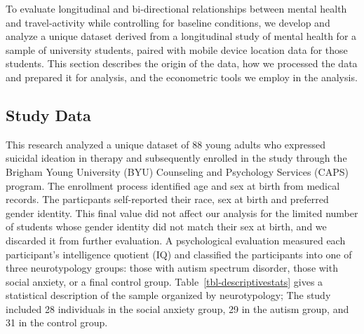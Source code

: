 \documentclass[
  letterpaper,
  number,
  review,
  3p]{elsarticle}
\begin{document}
To evaluate longitudinal and bi-directional relationships between mental
health and travel-activity while controlling for baseline conditions, we
develop and analyze a unique dataset derived from a longitudinal study
of mental health for a sample of university students, paired with mobile
device location data for those students. This section describes the
origin of the data, how we processed the data and prepared it for
analysis, and the econometric tools we employ in the analysis.

\subsection{Study Data}\label{study-data}

This research analyzed a unique dataset of 88 young adults who expressed
suicidal ideation in therapy and subsequently enrolled in the study
through the Brigham Young University (BYU) Counseling and Psychology
Services (CAPS) program. The enrollment process identified age and sex
at birth from medical records. The particpants self-reported their race,
sex at birth and preferred gender identity. This final value did not
affect our analysis for the limited number of students whose gender
identity did not match their sex at birth, and we discarded it from
further evaluation. A psychological evaluation measured each
participant's intelligence quotient (IQ) and classified the participants
into one of three neurotypology groups: those with autism spectrum
disorder, those with social anxiety, or a final control group.
Table~\ref{tbl-descriptivestats} gives a statistical description of the
sample organized by neurotypology; The study included 28 individuals in
the social anxiety group, 29 in the autism group, and 31 in the control
group.
\end{document}
